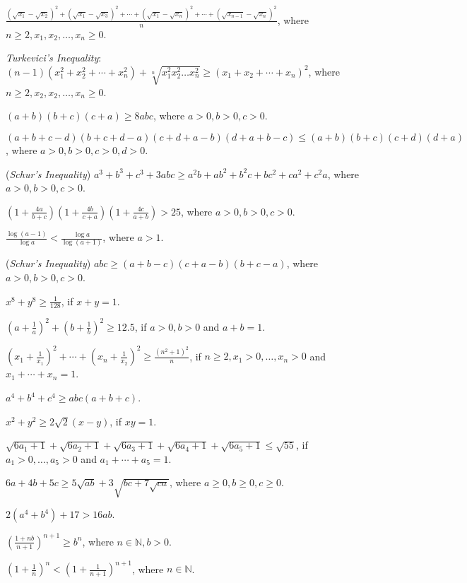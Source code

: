   $\frac{(\sqrt{x_1} - \sqrt{x_2})^2 + (\sqrt{x_1} -
  \sqrt{x_3})^2 + \cdots + (\sqrt{x_1} - \sqrt{x_n})^2 + \cdots + (\sqrt{x_{n - 1}} - \sqrt{x_n})^2}{n}$, where $n\geq 2, x_1, x_2,
  \ldots, x_n\geq 0$.
\item {\it Turkevici's Inequality}: $(n - 1)(x_1^2 + x_2^2 + \cdots + x_n^2) + \sqrt[n]{x_1^2x_2^2\ldots x_n^2}\geq (x_1 + x_2 +
  \cdots + x_n)^2$, where $n\geq 2, x_2, x_2, \ldots, x_n\geq 0$.
\item $(a + b)(b + c)(c + a)\geq 8abc$, where $a>0, b>0, c>0$.
\item $(a + b + c - d)(b + c + d - a)(c + d + a - b)(d + a + b - c)\leq (a + b)(b + c)(c + d)(d + a)$, where $a > 0, b > 0, c > 0,
  d > 0$.
\item ({\it Schur's Inequality}) $a^3 + b^3 + c^3 + 3abc \geq a^2b + ab^2 + b^2c + bc^2 + ca^2 + c^2a$, where $a > 0, b > 0, c > 0$.
\item $\left(1 + \frac{4a}{b + c}\right)\left(1 + \frac{4b}{c + a}\right)\left(1 + \frac{4c}{a + b}\right) > 25$, where $a > 0, b >
  0, c > 0$.
\item $\frac{\log(a - 1)}{\log a} < \frac{\log a}{\log(a + 1)}$, where $a > 1$.
\item ({\it Schur's Inequality}) $abc \geq (a + b - c)(c + a - b)(b + c - a)$, where $a>0, b>0, c>0$.
\item $x^8 + y^8 \geq \frac{1}{128}$, if $x + y = 1$.
\item $\left(a + \frac{1}{a}\right)^2 + \left(b + \frac{1}{b}\right)^2\geq 12.5$, if $a > 0, b > 0$ and $a + b = 1$.
\item $\left(x_1 + \frac{1}{x_1}\right)^2 + \cdots + \left(x_n + \frac{1}{x_2}\right)^2\geq \frac{(n^2 + 1)^2}{n}$, if $n\geq 2,
  x_1> 0, \ldots, x_n>0$ and $x_1 + \cdots + x_n = 1$.
\item $a^4 + b^4 + c^4 \geq abc(a + b + c)$.
\item $x^2 + y^2 \geq 2\sqrt{2}(x - y)$, if $xy = 1$.
\item $\sqrt{6a_1 + 1} + \sqrt{6a_2 + 1} + \sqrt{6a_3 + 1} + \sqrt{6a_4 + 1} + \sqrt{6a_5 + 1}\leq \sqrt{55}$, if $a_1 > 0, \ldots,
  a_5 > 0$ and $a_1 + \cdots + a_5 = 1$.
\item $6a + 4b + 5c\geq 5\sqrt{ab} + 3\sqrt{bc + 7\sqrt{ca}}$, where $a\geq 0, b\geq 0, c\geq 0$.
\item $2(a^4 + b^4) + 17 > 16 ab$.
\item $\left(\frac{1 + nb}{n + 1}\right)^{n + 1}\geq b^n$, where $n\in\mathbb{N}, b > 0$.
\item $\left(1 + \frac{1}{n}\right)^n < \left(1 + \frac{1}{n + 1}\right)^{n + 1}$, where $n\in\mathbb{N}$.
